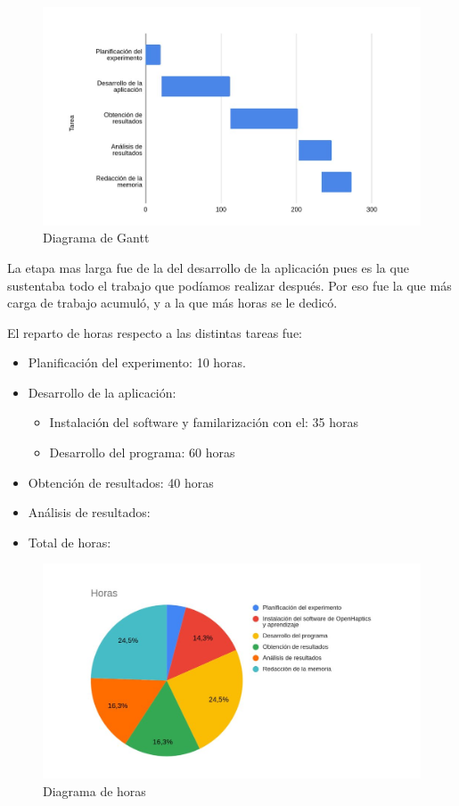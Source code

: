 \documentclass[a4paper,11pt, oneside]{book}
\begin{document}
\begin{figure}[H]
	
	\centering
	\includegraphics[width=\linewidth]{gantt}
	\caption{Diagrama de Gantt}
	\label{fig:figura1}
	
\end{figure}

La etapa mas larga fue de la del desarrollo de la aplicación pues es la que sustentaba todo el trabajo que podíamos realizar después. Por eso fue la que más carga de trabajo acumuló, y a la que más horas se le dedicó.



El reparto de horas respecto a las distintas tareas fue:
\begin{itemize}
	\item Planificación del experimento: 10 horas. 
	\item Desarrollo de la aplicación:
		\begin{itemize}
			\item Instalación del software y familarización con el: 35 horas
			\item Desarrollo del programa: 60 horas
		\end{itemize}
	\item Obtención de resultados: 40 horas
	\item Análisis de resultados:
	\item Total de horas: 
\end{itemize}

\begin{figure}[H]
	
	\centering
	\includegraphics[width=0.8\linewidth]{horas}
	\caption{Diagrama de horas}
	\label{fig:figura1}
	
\end{figure}
\end{document}
